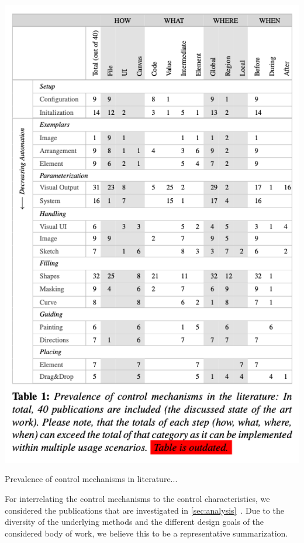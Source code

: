 \begin{table}
    \centering
    \includegraphics[width=\linewidth]{tables/table_controlmechanism.png}
    \caption{Prevalence of control mechanisms in literature... }
    \label{table:taxo_controlmechanism}
\end{table}



For interrelating the control mechanisms to the control characteristics, we considered the publications that are investigated in \cref{sec:analysis}~. Due to the diversity of the underlying methods and the different design goals of the considered body of work, we believe this to be a representative summarization.


